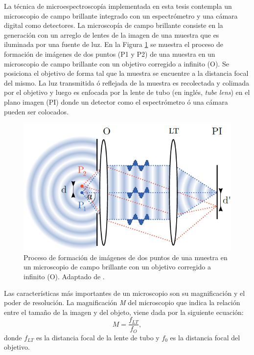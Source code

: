 La técnica de microespectroscopía implementada en esta tesis contempla un microscopio de campo brillante integrado con un espectrómetro y una cámara digital como detectores. La microscopía de campo brillante consiste en la generación con un arreglo de lentes de la imagen de una muestra que es iluminada por una fuente de luz. En la Figura \ref{fig:mdb} se muestra el proceso de formación de imágenes de dos puntos (P1 y P2) de una muestra en un microscopio de campo brillante con un objetivo corregido a infinito (O). Se posiciona el objetivo de forma tal que la muestra se encuentre a la distancia focal del mismo. La luz transmitida ó reflejada de la muestra es recolectada y colimada por el objetivo y luego es enfocada por la lente de tubo (en inglés, \textit{tube lens}) en el plano imagen (PI) donde un detector como el espectrómetro ó una cámara pueden ser colocados.

\begin{figure}[H]
	\centering
	\includegraphics[width=1.0\textwidth]{Figs/introduccion/martinbordenave.png}
	\caption{Proceso de formación de imágenes de dos puntos de una muestra en un microscopio de campo brillante con un objetivo corregido a infinito (O). Adaptado de \cite{borden}.}
	\label{fig:mdb}
\end{figure}

Las características más importantes de un microscopio son su magnificación y el poder de resolución. La magnificación \textit{M} del microscopio que indica la relación entre el tamaño de la imagen y del objeto, viene dada por la siguiente ecuación:
\begin{equation}
M = \frac{f_{LT}}{f_{O}},
\end{equation}	
donde $f_{LT}$ es la distancia focal de la lente de tubo y $f_{0}$ es la distancia focal del objetivo.


